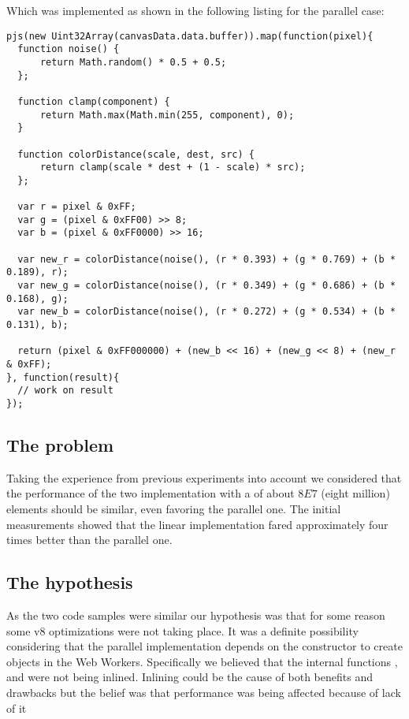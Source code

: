 Which was implemented as shown in the following listing for the parallel case:
\begin{lstlisting}[caption=Sepia tone initial parallel implementation]
pjs(new Uint32Array(canvasData.data.buffer)).map(function(pixel){
  function noise() {
      return Math.random() * 0.5 + 0.5;
  };

  function clamp(component) {
      return Math.max(Math.min(255, component), 0);
  }

  function colorDistance(scale, dest, src) {
      return clamp(scale * dest + (1 - scale) * src);
  };

  var r = pixel & 0xFF;
  var g = (pixel & 0xFF00) >> 8;
  var b = (pixel & 0xFF0000) >> 16;

  var new_r = colorDistance(noise(), (r * 0.393) + (g * 0.769) + (b * 0.189), r);
  var new_g = colorDistance(noise(), (r * 0.349) + (g * 0.686) + (b * 0.168), g);
  var new_b = colorDistance(noise(), (r * 0.272) + (g * 0.534) + (b * 0.131), b);

  return (pixel & 0xFF000000) + (new_b << 16) + (new_g << 8) + (new_r & 0xFF);
}, function(result){
  // work on result
});
\end{lstlisting}

\subsection{The problem}
Taking the experience from previous experiments into account we considered that the performance of the two implementation with a  of about \(8E7\) (eight million) elements should be similar, even favoring the parallel one. The initial measurements showed that the linear implementation fared approximately four times better than the parallel one.

\subsection{The hypothesis}
As the two code samples were similar our hypothesis was that for some reason some v8 optimizations were not taking place. It was a definite possibility considering that the parallel implementation depends on the \tfunction constructor to create \tfunction objects in the Web Workers. Specifically we believed that the internal functions ,  and  were not being inlined. Inlining could be the cause of both benefits\cite{inline-pro} and drawbacks\cite{inline-cons} but the belief was that performance was being affected because of lack of it

